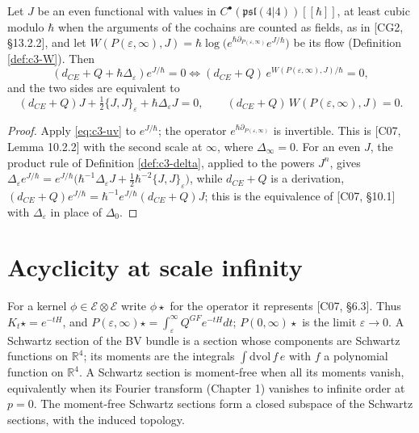 \begin{corollary}
\label{cor:c3-qme}
Let $J$ be an even functional with values in $C^\bullet(\mathfrak{psl}(4|4))[[\hbar]]$, at least cubic modulo $\hbar$ when the arguments of the cochains are counted as fields, as in [CG2, §13.2.2], and let $W(P(\varepsilon,\infty),J)=\hbar\log\big(e^{\hbar\partial_{P(\varepsilon,\infty)}}e^{J/\hbar}\big)$ be its flow (Definition \ref{def:c3-W}). Then
\[
(d_{CE}+Q+\hbar\Delta_\varepsilon)e^{J/\hbar}=0\iff(d_{CE}+Q)\,e^{W(P(\varepsilon,\infty),J)/\hbar}=0,
\]
and the two sides are equivalent to
\[
(d_{CE}+Q)J+\tfrac12\{J,J\}_\varepsilon+\hbar\Delta_\varepsilon J=0,\qquad (d_{CE}+Q)\,W(P(\varepsilon,\infty),J)=0 .
\]
\end{corollary}

\begin{proof}
Apply \eqref{eq:c3-uv} to $e^{J/\hbar}$; the operator $e^{\hbar\partial_{P(\varepsilon,\infty)}}$ is invertible. This is [C07, Lemma 10.2.2] with the second scale at $\infty$, where $\Delta_\infty=0$. For an even $J$, the product rule of Definition \ref{def:c3-delta}, applied to the powers $J^n$, gives $\Delta_\varepsilon e^{J/\hbar}=e^{J/\hbar}\big(\hbar^{-1}\Delta_\varepsilon J+\tfrac12\hbar^{-2}\{J,J\}_\varepsilon\big)$, while $d_{CE}+Q$ is a derivation, $(d_{CE}+Q)e^{J/\hbar}=\hbar^{-1}e^{J/\hbar}(d_{CE}+Q)J$; this is the equivalence of [C07, §10.1] with $\Delta_\varepsilon$ in place of $\Delta_0$.
\end{proof}

\section{Acyclicity at scale infinity}

For a kernel $\phi\in\mathscr E\otimes\mathscr E$ write $\phi\star$ for the operator it represents [C07, §6.3]. Thus $K_t\star=e^{-tH}$, and $P(\varepsilon,\infty)\star=\int_\varepsilon^\infty Q^{GF}e^{-tH}dt$; $P(0,\infty)\star$ is the limit $\varepsilon\to0$. A Schwartz section of the BV bundle is a section whose components are Schwartz functions on $\mathbb R^4$; its moments are the integrals $\int\mathrm{dvol}\,f\,e$ with $f$ a polynomial function on $\mathbb R^4$. A Schwartz section is moment-free when all its moments vanish, equivalently when its Fourier transform (Chapter 1) vanishes to infinite order at $p=0$. The moment-free Schwartz sections form a closed subspace of the Schwartz sections, with the induced topology.

